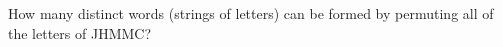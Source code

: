 How many distinct words (strings of letters) can be formed by permuting all of the letters of JHMMC?
